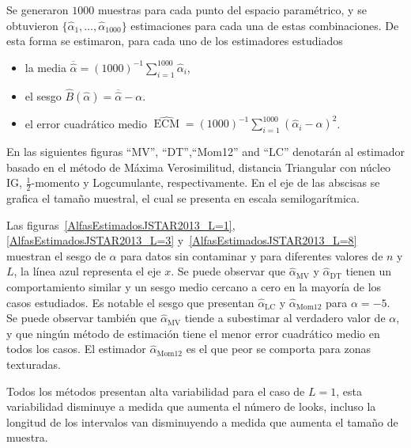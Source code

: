 Se generaron $1000$ muestras para cada punto del espacio paramétrico, y se obtuvieron $\{\widehat{\alpha}_1, \dots, \widehat{\alpha}_{1000}\}$ estimaciones para cada una de estas combinaciones. De esta forma se estimaron, para cada uno de los estimadores estudiados
\begin{itemize}
	\label{ExperimentoMontecarlo}
	\item la media $\overline{\widehat{\alpha}}=(1000)^{-1}{\sum_{i=1}^{1000}{\widehat{\alpha}_i}}$,
	\item el sesgo  $\widehat{B}(\widehat\alpha) = \overline{\widehat\alpha}- \alpha$.
	\item el error cuadrático medio $\widehat{\operatorname{ECM}}=({1000})^{-1}{\sum_{i=1}^{1000}{(\widehat{\alpha}_i-\alpha)^2}}$.
\end{itemize}

En las siguientes figuras ``MV'', ``DT'',``Mom12'' and ``LC'' denotarán al estimador basado en el método de Máxima Verosimilitud, distancia Triangular con núcleo IG, $\frac{1}{2}$-momento y Logcumulante, respectivamente. En el eje de las abscisas se grafica el tamaño muestral, el cual se presenta en escala semilogarítmica.

Las figuras~\ref{AlfasEstimadosJSTAR2013_L=1}, \ref{AlfasEstimadosJSTAR2013_L=3} y~\ref{AlfasEstimadosJSTAR2013_L=8} muestran el sesgo de $\widehat{\alpha}$ para datos sin contaminar y para diferentes valores de $n$ y $L$, la línea azul representa el eje $x$. Se puede observar que $\widehat{\alpha}_{\text{MV}}$ y $\widehat{\alpha}_{\text{DT}}$ tienen un comportamiento similar y un sesgo medio cercano a cero en la mayoría de los casos estudiados. Es notable el sesgo que presentan  $\widehat{\alpha}_{\text{LC}}$ y $\widehat{\alpha}_{\text{Mom12}}$ para $\alpha=-5$. Se puede observar también que $\widehat\alpha_{\text{MV}}$ tiende a subestimar al verdadero valor de $\alpha$, y que ningún método de estimación tiene el menor error cuadrático medio en todos los casos. El estimador $\widehat{\alpha}_{\text{Mom12}}$ es el que peor se comporta para zonas texturadas.

Todos los métodos presentan alta variabilidad para el caso de $L=1$, esta variabilidad disminuye a medida que aumenta el número de looks, incluso la longitud de los intervalos van disminuyendo a medida que aumenta el tamaño de muestra.

